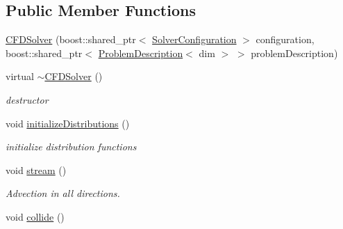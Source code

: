 \subsection*{Public Member Functions}
\begin{DoxyCompactItemize}
\item 
\hyperlink{classnatrium_1_1CFDSolver_a47ca594a73dc5ab04e319ba588cda3dd}{CFDSolver} (boost::shared\_\-ptr$<$ \hyperlink{classnatrium_1_1SolverConfiguration}{SolverConfiguration} $>$ configuration, boost::shared\_\-ptr$<$ \hyperlink{classnatrium_1_1ProblemDescription}{ProblemDescription}$<$ dim $>$ $>$ problemDescription)
\item 
\hypertarget{classnatrium_1_1CFDSolver_a7ca9bd709255ac87b34f869c984b913b}{
virtual \hyperlink{classnatrium_1_1CFDSolver_a7ca9bd709255ac87b34f869c984b913b}{$\sim$CFDSolver} ()}
\label{classnatrium_1_1CFDSolver_a7ca9bd709255ac87b34f869c984b913b}

\begin{DoxyCompactList}\small\item\em destructor \item\end{DoxyCompactList}\item 
\hypertarget{classnatrium_1_1CFDSolver_abe627b0bbde0635abb30b9bea4c72dc1}{
void \hyperlink{classnatrium_1_1CFDSolver_abe627b0bbde0635abb30b9bea4c72dc1}{initializeDistributions} ()}
\label{classnatrium_1_1CFDSolver_abe627b0bbde0635abb30b9bea4c72dc1}

\begin{DoxyCompactList}\small\item\em initialize distribution functions \item\end{DoxyCompactList}\item 
\hypertarget{classnatrium_1_1CFDSolver_ac32a318e504b31195eb61c2cdc2659fe}{
void \hyperlink{classnatrium_1_1CFDSolver_ac32a318e504b31195eb61c2cdc2659fe}{stream} ()}
\label{classnatrium_1_1CFDSolver_ac32a318e504b31195eb61c2cdc2659fe}

\begin{DoxyCompactList}\small\item\em Advection in all directions. \item\end{DoxyCompactList}\item 
\hypertarget{classnatrium_1_1CFDSolver_ac9bec7d0c4bcd5e02c5213ec09438c02}{
void \hyperlink{classnatrium_1_1CFDSolver_ac9bec7d0c4bcd5e02c5213ec09438c02}{collide} ()}
\label{classnatrium_1_1CFDSolver_ac9bec7d0c4bcd5e02c5213ec09438c02}


\end{DoxyCompactItemize}
